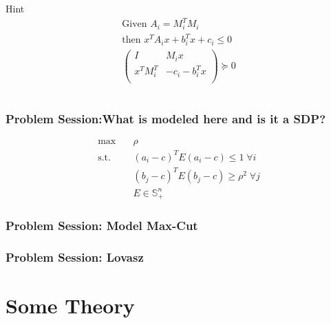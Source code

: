 \documentclass[11pt]{beamer}
\begin{document}
\begin{frame}
\begin{itemize}[leftmargin=-0.3cm]
\begin{columns}
\begin{column}{0.5\textwidth}
			\begin{block}{Hint}
			\scriptsize
			\begin{equation*}
			\begin{aligned}
			\text{Given }A_i=M_i^TM_i\\
			\text{then }x^TA_ix+b_i^Tx+c_i\leq 0 \\
			\begin{pmatrix}
			I & M_ix\\
			x^TM_i^T & -c_i-b_i^Tx\\
			\end{pmatrix}
			\succeq 0
			\end{aligned}
			\end{equation*}
			\end{block}
		\end{column}
		\end{columns}
		\end{itemize}
	\end{frame}
	\begin{frame}
		\frametitle{Problem Session:\newline What is modeled here and is it a SDP?}
		\begin{block}{\vspace*{-3ex}}
			\begin{equation*}
			\begin{aligned}
				\max\quad& \rho\\
				\text{s.t.}\quad&(a_i-c)^TE(a_i-c)\leq 1\;\forall i\\
				&(b_j-c)^TE(b_j-c)\geq \rho^2\;\forall j\\
				& E\in\mathbb{S}^n_+
			\end{aligned}
		\end{equation*}
		\end{block}
	\end{frame}
	\begin{frame}
		\frametitle{Problem Session: \newline Model Max-Cut}
	\end{frame}
	\begin{frame}
		\frametitle{Problem Session: \newline Lovasz}
	\end{frame}
\section{Some Theory}
\end{document}
